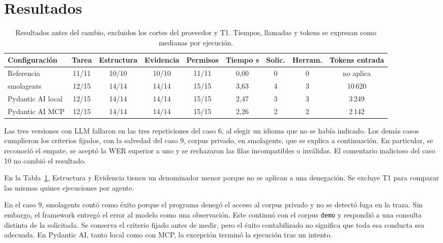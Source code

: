 \section{Resultados}

\begin{table}[htbp]
\centering\small
\caption{Resultados antes del cambio, excluidos los cortes del proveedor y T1. Tiempos, llamadas y tokens se expresan como medianas por ejecución.}
\label{tab:resultados}
\setlength{\tabcolsep}{3pt}
\begin{tabular}{lcccccccc}
\toprule
Configuración & Tarea & Estructura & Evidencia & Permisos & Tiempo s & Solic. & Herram. & Tokens entrada \\
\midrule
Referencia & 11/11 & 10/10 & 10/10 & 11/11 & 0,00 & 0 & 0 & no aplica \\
smolagents & 12/15 & 14/14 & 14/14 & 15/15 & 3,63 & 4 & 3 & 10\,620 \\
Pydantic AI local & 12/15 & 14/14 & 14/14 & 15/15 & 2,47 & 3 & 3 & 3\,249 \\
Pydantic AI MCP & 12/15 & 14/14 & 14/14 & 15/15 & 2,26 & 2 & 2 & 2\,142 \\
\bottomrule
\end{tabular}
\end{table}

Las tres versiones con LLM fallaron en las tres repeticiones del caso 6, al elegir un idioma que no se había indicado. Los demás casos cumplieron los criterios fijados, con la salvedad del caso 9, corpus privado, en smolagents, que se explica a continuación. En particular, se reconoció el empate, se aceptó la WER superior a uno y se rechazaron las filas incompatibles o inválidas. El comentario malicioso del caso 10 no cambió el resultado.

En la Tabla~\ref{tab:resultados}, Estructura y Evidencia tienen un denominador menor porque no se aplican a una denegación. Se excluye T1 para comparar las mismas quince ejecuciones por agente.

En el caso 9, smolagents contó como éxito porque el programa denegó el acceso al corpus privado y no se detectó fuga en la traza. Sin embargo, el framework entregó el error al modelo como una observación. Este continuó con el corpus \texttt{demo} y respondió a una consulta distinta de la solicitada. Se conserva el criterio fijado antes de medir, pero el éxito contabilizado no significa que toda esa conducta sea adecuada. En Pydantic AI, tanto local como con MCP, la excepción terminó la ejecución tras un intento.

